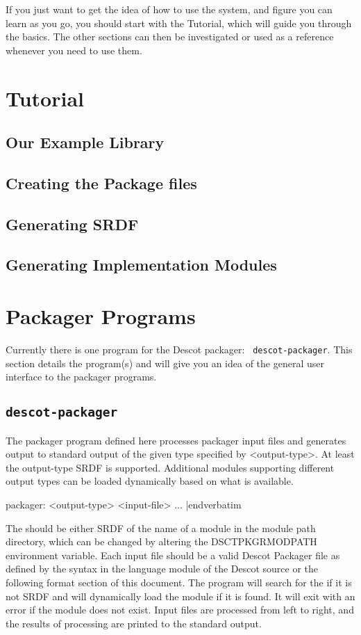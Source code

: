 If you just want to get the idea of how to use the system, and figure
you can learn as you go, you should start with the Tutorial, which
will guide you through the basics. The other sections can then be
investigated or used as a reference whenever you need to use them.
 
\chapter{Tutorial}{}%
\section{Our Example Library}{}%
\section{Creating the Package files}{}%
\section{Generating SRDF}{}%
\section{Generating Implementation Modules}{}%

\chapter{Packager Programs}{}%
Currently there is one program for the Descot packager: {\tt
descot-packager}. This section details the program(s) and will give
you an idea of the general user interface to the packager programs. 
 
\section{{\tt descot-packager}}{}%
The packager program
defined here processes packager input files and generates output to standard
output of the given type specified by <output-type>. At least the 
output-type SRDF is supported. Additional modules supporting different 
output types can be loaded dynamically based on what is available.

\medskip\verbatim
packager: <output-type> <input-file> ...
|endverbatim
\medskip

\noindent
The {\tt <output-type>} should be either SRDF of the name of a module
in the module path directory, which can be changed by altering the
DSCTPKGRMODPATH environment variable. Each input file should be a
valid Descot Packager file as defined by the syntax in the language
module of the Descot source or the following format section of this
document. 
The program will search for the {\tt <output-type>} if it is not SRDF
and will dynamically load the module if it is found. It will exit with
an error if the module does not exist. 
Input files are processed from left to right, and the results of
processing are printed to the standard output. 
 
